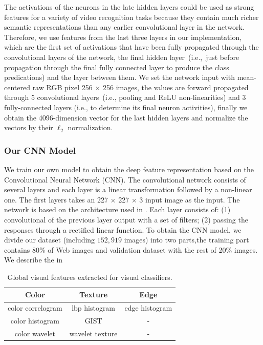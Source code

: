 \documentclass[11pt,twocolumn,twoside]{IEEEtran}
\begin{document}
The activations of the neurons in the late hidden layers could be used as strong features for a variety of video recognition tasks because
they contain much richer semantic representations than any earlier convolutional layer in the network. Therefore, we use features from the last
three layers in our implementation, which are the first set of activations that have been fully propagated through the convolutional layers
of the network, the final hidden layer~(i.e.,~just before propagation through the final fully connected layer to produce the class predications) and
the layer between them. We set the network input with mean-centered raw RGB pixel 256 $\times$ 256 images, the values are forward propagated through 5
convolutional layers~(i.e., pooling and ReLU non-linearities) and 3 fully-connected layers (i.e., to determine its final neuron activities), finally we obtain the 4096-dimension vector for the last hidden layers and normalize the vectors by their $\ell_{2}$ normalization.
\subsubsection{Our CNN Model}

We train our own model to obtain the deep feature representation based on the Convolutional Neural Network (CNN). The convolutional network consists of several layers and each
layer is a linear transformation followed by a non-linear one. The first layers takes an 227 $\times$ 227 $\times$ 3 input image as the input. The network is based on
the architecture used in \cite{CAFFE}. Each layer consists of: (1) convolutional of the previous layer output with a set of filters; (2) passing the responses through
a rectified linear function. To obtain the CNN model, we divide our dataset (including $152,919$ images) into two parts,the training part contains 80\% of Web images and validation dataset with the rest of 20\% images.
We describe the  in


\begin{table}[h]
 \centering \caption{Global visual features extracted for visual classifiers.}
\begin{tabular}{|c|c|c|}
\hline  Color  &  Texture   & Edge   \\
\hline
\hline color correlogram &lbp histogram    & edge histogram       \\
\hline  color histogram  &GIST    & -   \\
\hline  color wavelet    &wavelet texture & - \\
\hline
\end{tabular}
\label{tb:feat}
\end{table}
\end{document}
